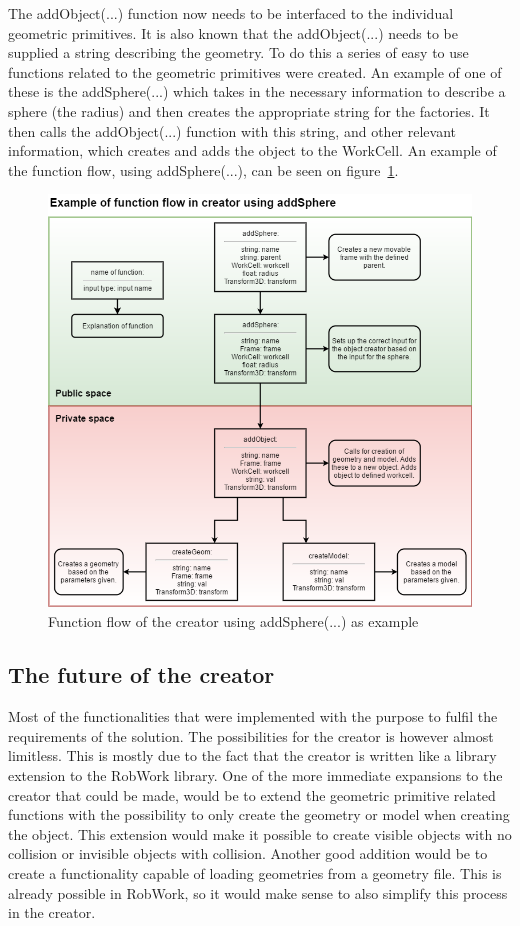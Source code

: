 The addObject(...) function now needs to be interfaced to the individual geometric primitives. It is also known that the addObject(...) needs to be supplied a string describing the geometry. To do this a series of easy to use functions related to the geometric primitives were created. An example of one of these is the addSphere(...) which takes in the necessary information to describe a sphere (the radius) and then creates the appropriate string for the factories. It then calls the addObject(...) function with this string, and other relevant information, which creates and adds the object to the WorkCell. An example of the function flow, using addSphere(...), can be seen on figure~\ref{fig:CreatorFlow}.

\begin{figure}[h]
	\centering
	\includegraphics[scale=0.55]{Figures/CreatorFlow.png}
	\caption{Function flow of the creator using addSphere(...) as example}
	\label{fig:CreatorFlow}
\end{figure}

\subsection{The future of the creator}
\label{subsec:futureCreator}
Most of the functionalities that were implemented with the purpose to fulfil the requirements of the solution. The possibilities for the creator is however almost limitless. This is mostly due to the fact that the creator is written like a library extension to the RobWork library. One of the more immediate expansions to the creator that could be made, would be to extend the geometric primitive related functions with the possibility to only create the geometry or model when creating the object. This extension would make it possible to create visible objects with no collision or invisible objects with collision. Another good addition would be to create a functionality capable of loading geometries from a geometry file. This is already possible in RobWork, so it would make sense to also simplify this process in the creator.